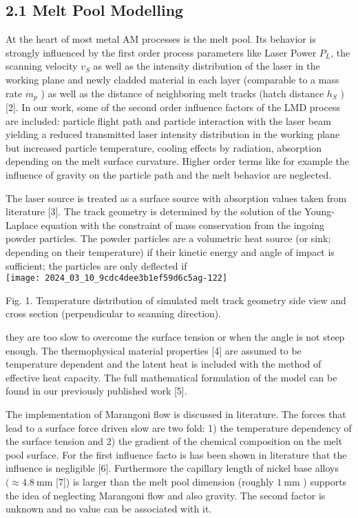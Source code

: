 \documentclass[10pt]{article}
\begin{document}
\subsection*{2.1 Melt Pool Modelling}
At the heart of most metal AM processes is the melt pool. Its behavior is strongly influenced by the first order process parameters like Laser Power $P_{L}$, the scanning velocity $v_{S}$ as well as the intensity distribution of the laser in the working plane and newly cladded material in each layer (comparable to a mass rate $\dot{m}_{p}$ ) as well as the distance of neighboring melt tracks (hatch distance $h_{S}$ ) [2]. In our work, some of the second order influence factors of the LMD process are included: particle flight path and particle interaction with the laser beam yielding a reduced transmitted laser intensity distribution in the working plane but increased particle temperature, cooling effects by radiation, absorption depending on the melt surface curvature. Higher order terms like for example the influence of gravity on the particle path and the melt behavior are neglected.

The laser source is treated as a surface source with absorption values taken from literature [3]. The track geometry is determined by the solution of the Young-Laplace equation with the constraint of mass conservation from the ingoing powder particles. The powder particles are a volumetric heat source (or sink; depending on their temperature) if their kinetic energy and angle of impact is sufficient; the particles are only deflected if\\
\texttt{[image: 2024\_03\_10\_9cdc4dee3b1ef59d6c5ag-122]}

Fig. 1. Temperature distribution of simulated melt track geometry side view and cross section (perpendicular to scanning direction).

they are too slow to overcome the surface tension or when the angle is not steep enough. The thermophysical material properties [4] are assumed to be temperature dependent and the latent heat is included with the method of effective heat capacity. The full mathematical formulation of the model can be found in our previously published work [5].

The implementation of Marangoni flow is discussed in literature. The forces that lead to a surface force driven slow are two fold: 1) the temperature dependency of the surface tension and 2) the gradient of the chemical composition on the melt pool surface. For the first influence facto is has been shown in literature that the influence is negligible [6]. Furthermore the capillary length of nickel base alloys $(\approx 4.8 \mathrm{~mm}$ [7]) is larger than the melt pool dimension (roughly $1 \mathrm{~mm}$ ) supports the idea of neglecting Marangoni flow and also gravity. The second factor is unknown and no value can be associated with it.
\end{document}
